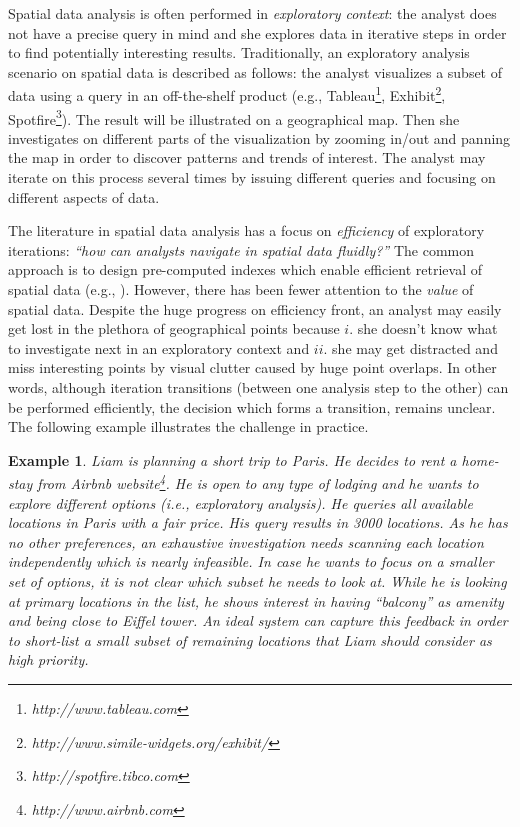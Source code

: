 \documentclass[conference,compsoc]{IEEEtran}
\newtheorem{example}{Example}
\begin{document}
Spatial data analysis is often performed in {\em exploratory context}: the analyst does not have a precise query in mind and she explores data in iterative steps in order to find potentially interesting results. Traditionally, an exploratory analysis scenario on spatial data is described as follows: the analyst visualizes a subset of data using a query in an off-the-shelf product (e.g., Tableau\footnote{\it http://www.tableau.com},
 Exhibit\footnote{\it http://www.simile-widgets.org/exhibit/},
Spotfire\footnote{\it http://spotfire.tibco.com}). The result will be illustrated on a geographical map. Then she investigates on different parts of the visualization by zooming in/out and panning the map in order to discover patterns and trends of interest. The analyst may iterate on this process several times by issuing different queries and focusing on different aspects of data.

The literature in spatial data analysis has a focus on {\em efficiency} of exploratory iterations: {\em ``how can analysts navigate in spatial data fluidly?''} The common approach is to design pre-computed indexes which enable efficient retrieval of spatial data (e.g., \cite{lins2013nanocubes}). However, there has been fewer attention to the {\em value} of spatial data. Despite the huge progress on efficiency front, an analyst may easily get lost in the plethora of geographical points because $i.$ she doesn't know what to investigate next in an exploratory context and $ii.$ she may get distracted and miss interesting points by visual clutter caused by huge point overlaps. In other words, although iteration transitions (between one analysis step to the other) can be performed efficiently, the decision which forms a transition, remains unclear. The following example illustrates the challenge in practice.

\begin{example}
\label{ex:airbnb}
Liam is planning a short trip to Paris. He decides to rent a home-stay from Airbnb website\footnote{\it http://www.airbnb.com}. He is open to any type of lodging and he wants to explore different options (i.e., exploratory analysis). He queries all available locations in Paris with a fair price. His query results in 3000 locations. As he has no other preferences, an exhaustive investigation needs scanning each location independently which is nearly infeasible. In case he wants to focus on a smaller set of options, it is not clear which subset he needs to look at. While he is looking at primary locations in the list, he shows interest in having ``balcony'' as amenity and being close to Eiffel tower. An ideal system can capture this feedback in order to short-list a small subset of remaining locations that Liam should consider as high priority.
\end{example}
\end{document}
